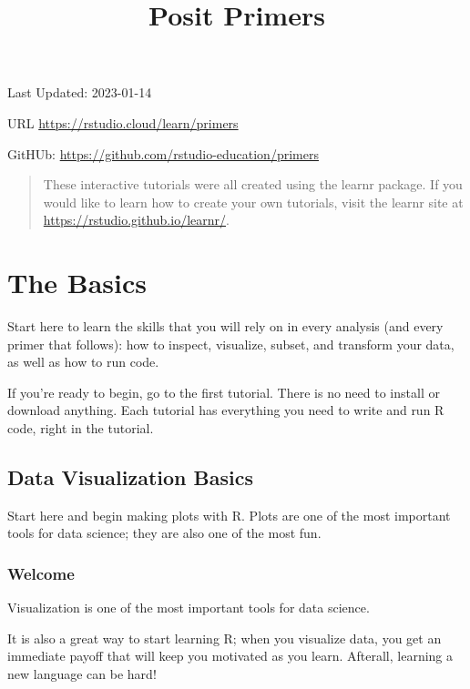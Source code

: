 \documentclass[
]{article}
\title{Posit Primers}
\author{}
\date{\vspace{-2.5em}}
\begin{document}
\maketitle

{
\setcounter{tocdepth}{2}
\tableofcontents
}
Last Updated: 2023-01-14

URL \url{https://rstudio.cloud/learn/primers}

GitHUb: \url{https://github.com/rstudio-education/primers}

\begin{quote}
These interactive tutorials were all created using the learnr package.
If you would like to learn how to create your own tutorials, visit the
learnr site at \url{https://rstudio.github.io/learnr/}.
\end{quote}

\hypertarget{the-basics}{%
\section{The Basics}\label{the-basics}}

Start here to learn the skills that you will rely on in every analysis
(and every primer that follows): how to inspect, visualize, subset, and
transform your data, as well as how to run code.

If you're ready to begin, go to the first tutorial. There is no need to
install or download anything. Each tutorial has everything you need to
write and run R code, right in the tutorial.

\hypertarget{data-visualization-basics}{%
\subsection{Data Visualization Basics}\label{data-visualization-basics}}

Start here and begin making plots with R. Plots are one of the most
important tools for data science; they are also one of the most fun.

\hypertarget{welcome}{%
\subsubsection{Welcome}\label{welcome}}

Visualization is one of the most important tools for data science.

It is also a great way to start learning R; when you visualize data, you
get an immediate payoff that will keep you motivated as you learn.
Afterall, learning a new language can be hard!
\end{document}

